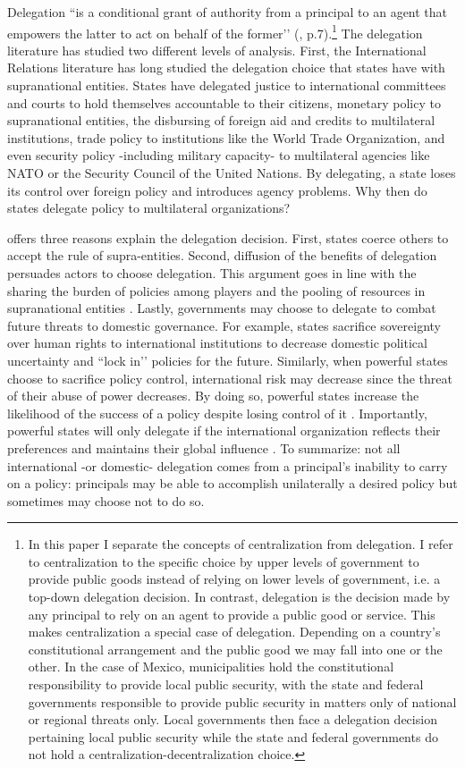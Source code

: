 \documentclass[12pt]{amsart}
\numberwithin{equation}{section}
\theoremstyle{definition}
\theoremstyle{definition}
\theoremstyle{definition}
\begin{document}
Delegation ``is a conditional grant of authority from a principal to an agent that empowers the latter to act on behalf of the former’’ (\citet{Hawkins_etal_2006}, p.7).\footnote{In this paper I separate the concepts of centralization from delegation. I refer to centralization to the specific choice by upper levels of government to provide public goods instead of relying on lower levels of government, i.e. a top-down delegation decision. In contrast, delegation is the decision made by any principal to rely on an agent to provide a public good or service. This makes centralization a special case of delegation.  Depending on a country’s constitutional arrangement and the public good we may fall into one or the other. In the case of Mexico, municipalities hold the constitutional responsibility to provide local public security, with the state and federal governments responsible to provide public security in matters only of national or regional threats only.  Local governments then face a delegation decision pertaining local public security while the state and federal governments do not hold a centralization-decentralization choice.} The delegation literature has studied two different levels of analysis. First, the International Relations literature has long studied the delegation choice that states have with supranational entities. States have delegated justice to international committees and courts to hold themselves accountable to their citizens, monetary policy to supranational entities, the disbursing of foreign aid and credits to multilateral institutions, trade policy to institutions like the World Trade Organization, and even security policy -including military capacity- to multilateral agencies like NATO or the Security Council of the United Nations. By delegating, a state loses its control over foreign policy and introduces agency problems. Why then do states delegate policy to multilateral organizations?

\citet{Moravcsik_2000} offers three reasons explain the delegation decision. First, states coerce others to accept the rule of supra-entities. Second, diffusion of the benefits of delegation persuades actors to choose delegation. This argument goes in line with the sharing the burden of policies among players and the pooling of resources in supranational entities \citep{milner_2011}.  Lastly, governments may choose to delegate to combat future threats to domestic governance. For example, states sacrifice sovereignty over human rights to international institutions to decrease domestic political uncertainty and ``lock in’’ policies for the future. Similarly, when powerful states choose to sacrifice policy control, international risk may decrease since the threat of their abuse of power decreases. By doing so, powerful states increase the likelihood of the success of a policy despite losing control of it \citep{lake_2009, milner_2011}. Importantly, powerful states will only delegate if the international organization reflects their preferences and maintains their global influence \citep{Hawkins_etal_2006}. To summarize: not all international -or domestic- delegation comes from a principal’s inability to carry on a policy: principals may be able to accomplish unilaterally a desired policy but sometimes may choose not to do so.
\end{document}
